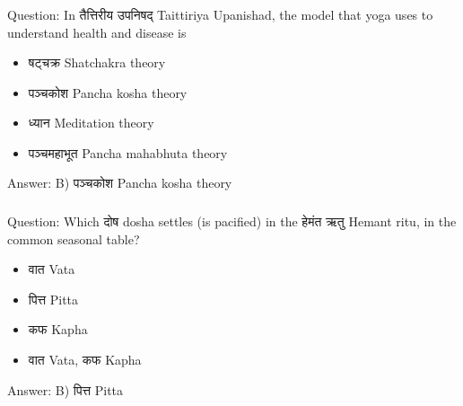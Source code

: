 \begin{frame}[fragile]\frametitle{}

Question: In तैत्तिरीय उपनिषद् Taittiriya Upanishad, the model that yoga uses to understand health and disease is

\begin{itemize}
\item[A)] षट्चक्र Shatchakra theory
\item[B)] पञ्चकोश Pancha kosha theory
\item[C)] ध्यान Meditation theory
\item[D)] पञ्चमहाभूत Pancha mahabhuta theory
\end{itemize}

Answer: B) पञ्चकोश Pancha kosha theory
\end{frame}

%
%
%

\begin{frame}[fragile]\frametitle{}

Question: Which दोष dosha settles (is pacified) in the हेमंत ऋतु Hemant ritu, in the common seasonal table?

\begin{itemize}
\item[A)] वात Vata
\item[B)] पित्त Pitta
\item[C)] कफ Kapha
\item[D)] वात Vata, कफ Kapha
\end{itemize}

Answer: B) पित्त Pitta
\end{frame}

